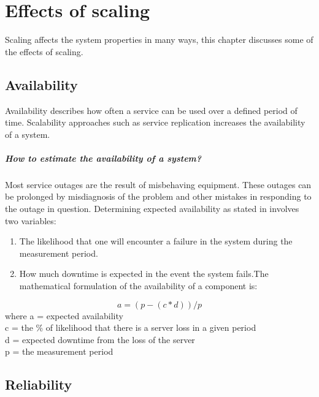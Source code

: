 \chapter{Effects of scaling}
\label{ch:Effects of scaling}


Scaling affects the system properties in many ways, this chapter discusses some of the effects of scaling.

\section{Availability}
Availability describes how often a service can be used over a defined period of time. Scalability approaches such as service replication increases the availability of a system.

\paragraph{How to estimate the availability of a system?}

Most service outages are the result of misbehaving equipment. These outages can be prolonged by misdiagnosis of the problem and other mistakes in responding to the outage in question. Determining expected availability as stated in \cite{reese_cloud_nodate} involves two variables:

\begin{enumerate}


	\item  The likelihood that one will encounter a failure in the system during the measurement period.

	\item  How much downtime is expected in the event the system fails.The mathematical formulation of the availability of a component is: 
\end{enumerate}
\begin{equation}
a = (p - (c*d))/p
\end{equation}
where a = expected availability\\
c = the \% of likelihood that there is a server loss in a given period\\
d = expected downtime from the loss of the server\\
p = the measurement period\\

\section{Reliability}

